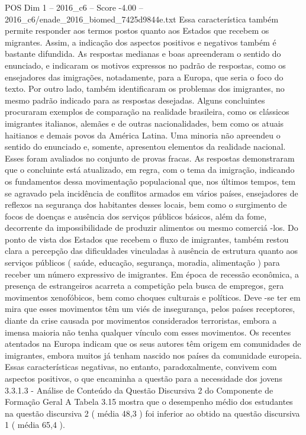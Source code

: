 \begin{textsample}{POS Dim 1 – 2016\_c6 – Score -4.00 – 2016\_c6/enade\_2016\_biomed\_7425d9844e.txt}
Essa característica também permite responder aos termos postos quanto aos Estados que recebem os migrantes.
Assim, a indicação dos aspectos positivos e negativos também é bastante difundida.
As respostas medianas e boas apreenderam o sentido do enunciado, e indicaram os motivos expressos no padrão de respostas, como os ensejadores das imigrações, notadamente, para a Europa, que seria o foco do texto.
Por outro lado, também identificaram os problemas dos imigrantes, no mesmo padrão indicado para as respostas desejadas.
Alguns concluintes procuraram exemplos de comparação na realidade brasileira, como os clássicos imigrantes italianos, alemães e de outras nacionalidades, bem como os atuais haitianos e demais povos da América Latina.
Uma minoria não apreendeu o sentido do enunciado e, somente, apresentou elementos da realidade nacional.
Esses foram avaliados no conjunto de provas fracas.
As respostas demonstraram que o concluinte está atualizado, em regra, com o tema da imigração, indicando os fundamentos dessa movimentação populacional que, nos últimos tempos, tem se agravado pela incidência de conflitos armados em vários países, ensejadores de reflexos na segurança dos habitantes desses locais, bem como o surgimento de focos de doenças e ausência dos serviços públicos básicos, além da fome, decorrente da impossibilidade de produzir alimentos ou mesmo comerciá -los.
Do ponto de vista dos Estados que recebem o fluxo de imigrantes, também restou clara a percepção das dificuldades vinculadas à ausência de estrutura quanto aos serviços públicos ( saúde, educação, segurança, moradia, alimentação ) para receber um número expressivo de imigrantes.
Em época de recessão econômica, a presença de estrangeiros acarreta a competição pela busca de empregos, gera movimentos xenofóbicos, bem como choques culturais e políticos.
Deve -se ter em mira que esses movimentos têm um viés de insegurança, pelos países receptores, diante da crise causada por movimentos considerados terroristas, embora a imensa maioria não tenha qualquer vínculo com esses movimentos.
Os recentes atentados na Europa indicam que os seus autores têm origem em comunidades de imigrantes, embora muitos já tenham nascido nos países da comunidade europeia.
Essas características negativas, no entanto, paradoxalmente, convivem com aspectos positivos, o que encaminha a questão para a necessidade dos jovens 3.3.1.3 - Análise de Conteúdo da Questão Discursiva 2 do Componente de Formação Geral A Tabela 3.15 mostra que o desempenho médio dos estudantes na questão discursiva 2 ( média 48,3 ) foi inferior ao obtido na questão discursiva 1 ( média 65,4 ).

\end{textsample}
